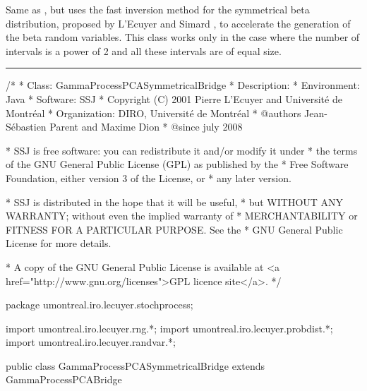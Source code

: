 
Same as , but uses the fast inversion method
for the symmetrical beta distribution, proposed by L'Ecuyer and Simard 
\cite {rLEC06a}, to accelerate the generation of the beta random variables.
This class works only in the case where the number of intervals is a power of
2 and all these intervals are of equal size.

\bigskip\hrule\bigskip

\begin{code}
\begin{hide}
/*
 * Class:        GammaProcessPCASymmetricalBridge
 * Description:  
 * Environment:  Java
 * Software:     SSJ 
 * Copyright (C) 2001  Pierre L'Ecuyer and Université de Montréal
 * Organization: DIRO, Université de Montréal
 * @authors      Jean-Sébastien Parent and Maxime Dion
 * @since        july 2008

 * SSJ is free software: you can redistribute it and/or modify it under
 * the terms of the GNU General Public License (GPL) as published by the
 * Free Software Foundation, either version 3 of the License, or
 * any later version.

 * SSJ is distributed in the hope that it will be useful,
 * but WITHOUT ANY WARRANTY; without even the implied warranty of
 * MERCHANTABILITY or FITNESS FOR A PARTICULAR PURPOSE.  See the
 * GNU General Public License for more details.

 * A copy of the GNU General Public License is available at
   <a href="http://www.gnu.org/licenses">GPL licence site</a>.
 */
\end{hide}
package umontreal.iro.lecuyer.stochprocess;\begin{hide}
import umontreal.iro.lecuyer.rng.*;
import umontreal.iro.lecuyer.probdist.*;
import umontreal.iro.lecuyer.randvar.*;

\end{hide}

public class GammaProcessPCASymmetricalBridge extends GammaProcessPCABridge \begin{hide} {
\end{hide}
\end{code}
